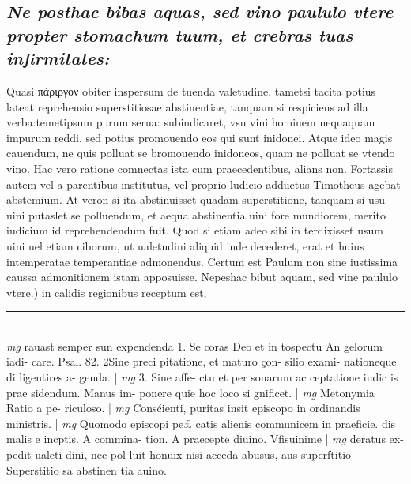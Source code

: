 \documentclass{article}
\begin{document}
\begin{pages}
\subsection*{\textit{Ne posthac bibas aquas, sed vino paululo vtere propter stomachum tuum, et crebras tuas infirmitates: }}\pstart Quasi πάριργον obiter inspersum de tuenda valetudine, tametsi tacita potius lateat reprehensio superstitiosae abstinentiae, tanquam si respiciens ad illa verba:temetipsum purum serua: subindicaret, vsu vini hominem nequaquam impurum reddi, sed potius promouendo eos qui sunt inidonei. Atque ideo magis cauendum, ne quis polluat se bromouendo inidoneos, quam ne polluat se vtendo vino. Hac vero ratione comnectas ista cum praecedentibus, alians non. Fortassis autem vel a parentibus institutus, vel proprio ludicio adductus Timotheus agebat abstemium. At veron si ita abstinuisset quadam superstitione, tanquam si usu uini putaslet se polluendum, et aequa abstinentia uini fore mundiorem, merito iudicium id reprehendendum fuit. Quod si etiam adeo sibi in terdixisset usum uini uel etiam ciborum, ut ualetudini aliquid inde decederet, erat et huius intemperatae temperantiae admonendus. Certum est Paulum non sine iustissima caussa admonitionem istam apposuisse.  \pend\pstart Nepeshac bibut aquam, sed vine paululo vtere.) in calidis regionibus receptum est,  \pend
\vspace{0.5cm}\noindent
\vspace{0.2cm}\rule{1cm}{0.2pt}\\ 
\hspace{0.2cm}\textit{mg}
\footnotesize rauast semper sun expendenda 1. Se coras Deo et in tospectu An gelorum iadi- care. Psal. 82. 2Sine preci pitatione, et maturo çon- silio exami- nationeque di ligentires a- genda. 
\normalsize| 
\hspace{0.2cm}\textit{mg}
\footnotesize 3. Sine affe- ctu et per sonarum ac ceptatione iudic is prae sidendum. Manus im- ponere quie hoc loco si gnificet. 
\normalsize| 
\hspace{0.2cm}\textit{mg}
\footnotesize Metonymia Ratio a pe- riculoso. 
\normalsize| 
\hspace{0.2cm}\textit{mg}
\footnotesize Consćienti, puritas insit episcopo in ordinandis ministris. 
\normalsize| 
\hspace{0.2cm}\textit{mg}
\footnotesize Quomodo episcopi pe£ catis alienis communicem in praeficie. dis malis e incptis. A commina- tion. A praecepte diuino. Vfisuinime 
\normalsize| 
\hspace{0.2cm}\textit{mg}
\footnotesize deratus ex- pedit ualeti dini, nec pol luit honuix nisi acceda abusus, aus superftitio Superstitio sa abstinen tia auino. 
\normalsize| 

\end{pages}
\end{document}
